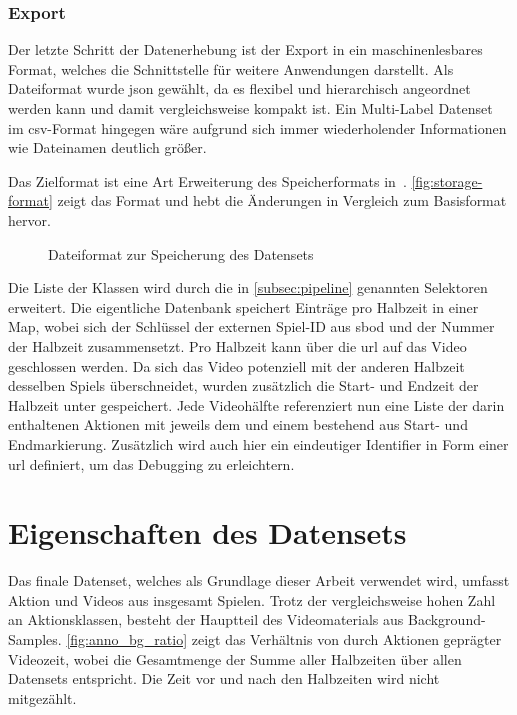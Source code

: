 \subsubsection{Export}

Der letzte Schritt der Datenerhebung ist der Export in ein maschinenlesbares Format, welches die Schnittstelle für weitere Anwendungen darstellt.
Als Dateiformat wurde \gls{json} gewählt, da es flexibel und hierarchisch angeordnet werden kann und damit vergleichsweise kompakt ist.
Ein Multi-Label Datenset im \gls{csv}-Format hingegen wäre aufgrund sich immer wiederholender Informationen wie Dateinamen deutlich größer.

Das Zielformat ist eine Art Erweiterung des Speicherformats in~\cite{Caba15}.
\autoref{fig:storage-format} zeigt das Format und hebt die Änderungen in Vergleich zum Basisformat hervor.

\begin{figure}
    \centering
    \caption{Dateiformat zur Speicherung des Datensets}
    \label{fig:storage-format}
\end{figure}

Die Liste der Klassen wird durch die in \autoref{subsec:pipeline} genannten Selektoren erweitert.
Die eigentliche Datenbank speichert Einträge pro Halbzeit in einer Map, wobei sich der Schlüssel der externen Spiel-ID aus \gls{sbod} und der Nummer der Halbzeit zusammensetzt.
Pro Halbzeit kann über die \gls{url} auf das Video geschlossen werden.
Da sich das Video potenziell mit der anderen Halbzeit desselben Spiels überschneidet, wurden zusätzlich die Start- und Endzeit der Halbzeit unter  gespeichert.
Jede Videohälfte referenziert nun eine Liste der darin enthaltenen Aktionen mit jeweils dem  und einem  bestehend aus Start- und Endmarkierung.
Zusätzlich wird auch hier ein eindeutiger Identifier in Form einer \gls{url} definiert, um das Debugging zu erleichtern.

\section{Eigenschaften des Datensets}
\label{sec:eigenschaften-des-datensets}

Das finale Datenset, welches als Grundlage dieser Arbeit verwendet wird, umfasst \noaction Aktion und \novideos Videos aus insgesamt \nomatches Spielen.
Trotz der vergleichsweise hohen Zahl an Aktionsklassen, besteht der Hauptteil des Videomaterials aus Background-Samples.
\autoref{fig:anno_bg_ratio} zeigt das Verhältnis von durch Aktionen geprägter Videozeit, wobei die Gesamtmenge der Summe aller Halbzeiten über allen Datensets entspricht.
Die Zeit vor und nach den Halbzeiten wird nicht mitgezählt.

